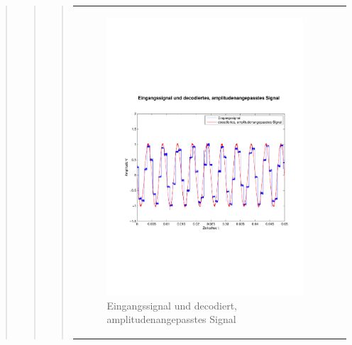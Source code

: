 \begin{quote}
\begin{quote}
\begin{quote}
\begin{center}
\begin{tabular}{ll}
                \hspace{-4cm}
                    \begin{minipage}{0.6\textwidth}
                        \begin{figure}[H]
                            \includegraphics[scale=0.4, trim = 0.8cm 7cm 0.8cm
                            7.5cm, clip]
                            {./Bilder/sin8_Eingang_vs_DecodiertAmpl-angepasst}
                              \caption{Eingangssignal und decodiert, \newline
                              amplitudenangepasstes Signal}
                        \end{figure}
                    \end{minipage}
                    

\end{tabular}
\end{center}
\end{quote}
\end{quote}
\end{quote}
